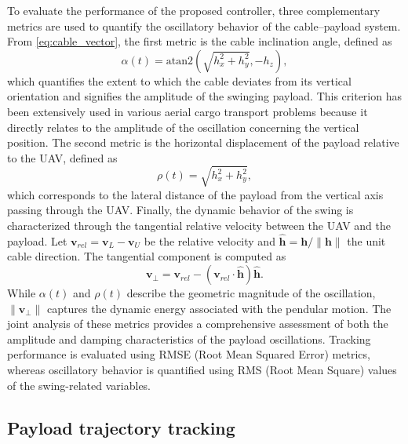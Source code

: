 \documentclass[sn-mathphys-num]{sn-jnl}
\theoremstyle{thmstyleone}%
\theoremstyle{thmstyletwo}%
\theoremstyle{thmstylethree}%
\begin{document}
To evaluate the performance of the proposed controller, three complementary metrics are used to quantify the oscillatory behavior of the cable–payload system. From \eqref{eq:cable_vector}, the first metric is the cable inclination angle, defined as
\begin{equation}
\alpha(t)=\mathrm{atan2}\!\left(\sqrt{h_x^2+h_y^2},-h_z\right),
\end{equation}
which quantifies the extent to which the cable deviates from its vertical orientation and signifies the amplitude of the swinging payload. This criterion has been extensively used in various aerial cargo transport problems because it directly relates to the amplitude of the oscillation concerning the vertical position. The second metric is the horizontal displacement of the payload relative to the UAV, defined as
\begin{equation}
\rho(t)=\sqrt{h_x^2+h_y^2},
\end{equation}
which corresponds to the lateral distance of the payload from the vertical axis passing through the UAV. Finally, the dynamic behavior of the swing is characterized through the tangential relative velocity between the UAV and the payload. Let $\mathbf{v}_{rel}=\mathbf{v}_L-\mathbf{v}_U$ be the relative velocity and $\hat{\mathbf{h}}=\mathbf{h}/\|\mathbf{h}\|$ the unit cable direction. The tangential component is computed as
\begin{equation}
\mathbf{v}_{\perp}=\mathbf{v}_{rel}-(\mathbf{v}_{rel}\cdot\hat{\mathbf{h}})\hat{\mathbf{h}}.
\end{equation}
While $\alpha(t)$ and $\rho(t)$ describe the geometric magnitude of the oscillation, $\|\mathbf{v}_{\perp}\|$ captures the dynamic energy associated with the pendular motion. The joint analysis of these metrics provides a comprehensive assessment of both the amplitude and damping characteristics of the payload oscillations. Tracking performance is evaluated using RMSE (Root Mean Squared Error) metrics, whereas oscillatory behavior is quantified using RMS (Root Mean Square) values of the swing-related variables.

\subsection{Payload trajectory tracking}
\end{document}
